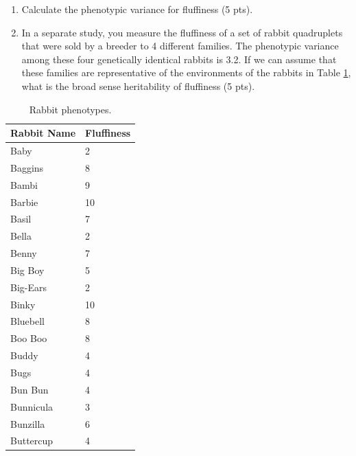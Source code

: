 \documentclass[]{article}
\begin{document}
\begin{enumerate}
\begin{enumerate}
\item Calculate the phenotypic variance for fluffiness (5 pts).
\item In a separate study, you measure the fluffiness of a set of rabbit quadruplets that were sold by a breeder to 4 different families.  The phenotypic variance among these four genetically identical rabbits is 3.2. If we can assume that these families are representative of the environments of the rabbits in Table \ref{fluffy}, what is the broad sense heritability of fluffiness (5 pts).

\end{enumerate}

\begin{table}[h]
\caption[]{Rabbit phenotypes.}
\begin{center}
\begin{tabular}{ll}
Rabbit Name & Fluffiness \\  \hline
Baby & 2\\
Baggins & 8\\
Bambi & 9\\
Barbie & 10\\
Basil & 7\\
Bella & 2\\
Benny & 7\\
Big Boy & 5\\
Big-Ears & 2\\
Binky & 10\\
Bluebell & 8\\
Boo Boo & 8\\
Buddy & 4\\
Bugs & 4\\
Bun Bun & 4\\
Bunnicula & 3\\
Bunzilla & 6\\
Buttercup & 4\\
\end{tabular}
\end{center}
\label{fluffy}
\end{table}



\end{enumerate}
\end{document}
